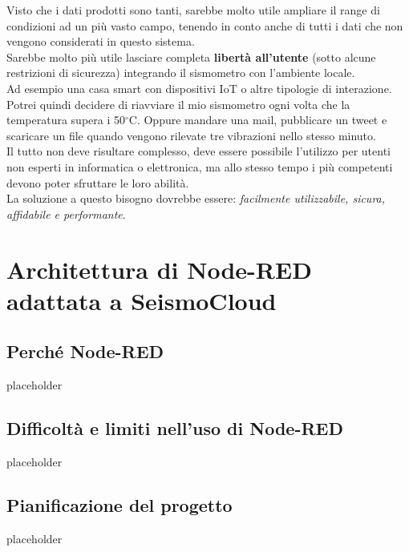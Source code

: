 \documentclass[a4paper,10pt]{memoir}
\begin{document}
Visto che i dati prodotti sono tanti, sarebbe molto utile ampliare il range di condizioni ad un più vasto campo, tenendo in conto anche di tutti i dati che non vengono considerati in questo sistema.\\
Sarebbe molto più utile lasciare completa \textbf{libertà all'utente} (sotto alcune restrizioni di sicurezza) integrando il sismometro con l'ambiente locale. 
\\
Ad esempio una casa smart con dispositivi IoT o altre tipologie di interazione. 
\\
Potrei quindi decidere di riavviare il mio sismometro ogni volta che la temperatura supera i 50$^{\circ}$C. Oppure mandare una mail, pubblicare un tweet e scaricare un file quando vengono rilevate tre vibrazioni nello stesso minuto.
\\
Il tutto non deve risultare complesso, deve essere possibile l'utilizzo per utenti non esperti in informatica o elettronica, ma allo stesso tempo i più competenti devono poter sfruttare le loro abilità.
\\
La soluzione a questo bisogno dovrebbe essere: \textit{facilmente utilizzabile, sicura, affidabile e performante}.
\clearpage

\chapter{Architettura di Node-RED adattata a SeismoCloud}

\section{Perché Node-RED}

placeholder

\clearpage

\section{Difficoltà e limiti nell'uso di Node-RED}

placeholder

\clearpage

\section{Pianificazione del progetto}

placeholder

\clearpage
\end{document}
